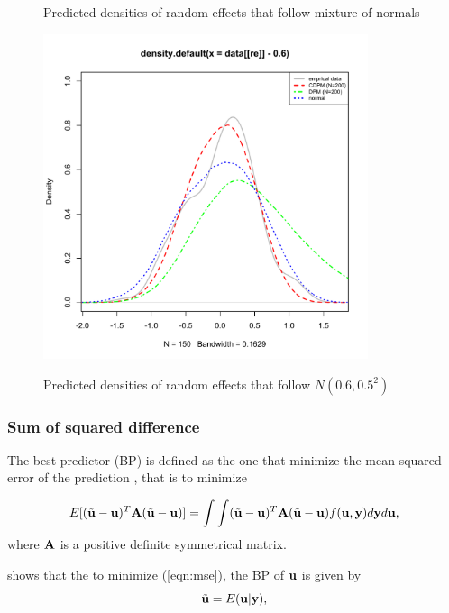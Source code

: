 \documentclass[12pt]{article}
\begin{document}
\begin{figure}[H]
\begin{minipage}{0.5\textwidth}
\label{fig: normal_dpm}
\caption{\small Predicted densities of random effects that follow mixture of normals}
\end{minipage}
\begin{minipage}{0.5\textwidth}
\centering
\includegraphics[width=0.85\textwidth]{ui_normal.pdf}
\label{fig: normal_dpm}
\caption{\small Predicted densities of random effects that follow $N(0.6, 0.5^2)$}
\end{minipage}
\end{figure}


\subsubsection*{Sum of squared difference}%
The best predictor (BP) is defined as the one that minimize the mean squared error of the prediction \cite{mcculloch2001generalized}, that is to minimize

\begin{equation}\label{eqn:mse}
E[(\tilde{\bf u}-{\bf u})^T{\bf A}(\tilde{\bf u}-{\bf u})]=\int\int(\tilde{\bf u}-{\bf u})^T{\bf A}(\tilde{\bf u}-{\bf u})f({\bf u, y})d{\bf y}d{\bf u},
\end{equation}
where ${\bf A}$ is a positive definite symmetrical matrix.

\cite{searle2009variance} shows that the to minimize (\ref{eqn:mse}), the BP of ${\bf u}$ is given by
\begin{equation}\label{eqn:bp}
\tilde{\bf u}=E({\bf u}|{\bf y}),
\end{equation}
\end{document}
